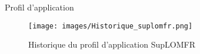 \begin{frame}{Profil d'application}
	\begin{figure}
	  \centering
	  \texttt{[image: images/Historique\_suplomfr.png]}
	  \caption{Historique du profil d'application SupLOMFR\footnotemark}
	\end{figure}
\end{frame}
